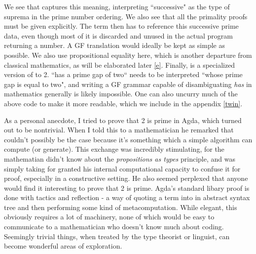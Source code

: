 We see that  captures this meaning, interpreting
``successive" as the type of suprema in the prime number ordering. We also see
that all the primality proofs must be given explicitly. The term 
then has to reference this successive prime data, even though most of it is
discarded and unused in the actual program returning a number. A GF translation
would ideally be kept as simple as possible. We also use propositional equality
here, which is another departure from classical mathematics, as will be
elaborated later \ref{e}. Finally,  is a specialized version of
 to 2. ``has a prime gap of two`` needs to be interpreted ``whose
prime gap is equal to two", and writing a GF grammar capable of disambiguating
\emph{has} in mathematics generally is likely impossible. One can also uncurry
much of the above code to make it more readable, which we include in the
appendix \ref{twin}.

As a personal anecdote, I tried to prove that 2 is prime in Agda, which turned
out to be nontrivial. When I told this to a mathematician he remarked that
couldn't possibly be the case because it's something which a simple algorithm
can compute (or generate). This exchange was incredibly stimulating, for the
mathematian didn't know about the \emph{propositions as types} principle, and
was simply taking for granted his internal computational capacity to confuse it
for proof, especially in a constructive setting. He also seemed perplexed that
anyone would find it interesting to prove that 2 is prime. Agda's standard
libary proof is done with tactics and reflection - a way of quoting a term into
in abstract syntax tree and then performing some kind of metacomputation. While
elegant, this obviously requires a lot of machinery, none of which would be easy
to communicate to a mathematician who doesn't know much about coding. Seemingly
trivial things, when treated by the type theorist or linguist, can become
wonderful areas of exploration.
